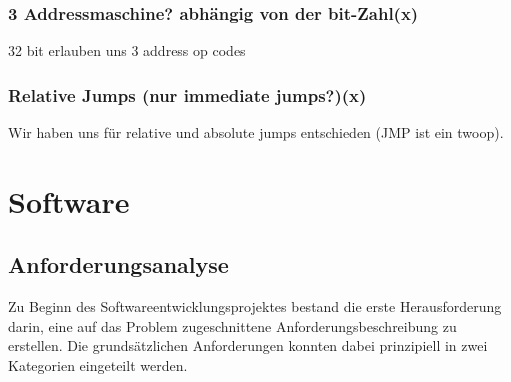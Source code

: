 \documentclass[paper=a4,fontsize=12pt]{scrreprt}
\begin{document}
\subsection{3 Addressmaschine? abhängig von der bit-Zahl(x)}
32 bit erlauben uns 3 address op codes

\subsection{Relative Jumps (nur immediate jumps?)(x)}
Wir haben uns für relative und absolute jumps entschieden (JMP ist ein twoop).

\chapter{Software}
\section{Anforderungsanalyse}
Zu Beginn des Softwareentwicklungsprojektes bestand die erste Herausforderung darin, eine auf das Problem zugeschnittene Anforderungsbeschreibung zu erstellen. Die grundsätzlichen Anforderungen konnten dabei prinzipiell in zwei Kategorien eingeteilt werden. 
\end{document}
